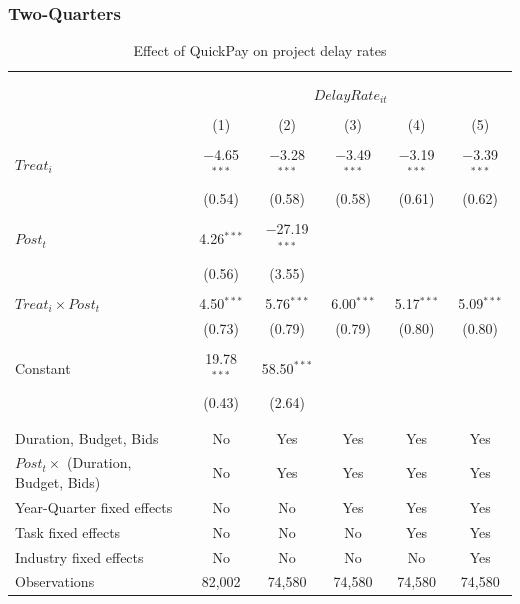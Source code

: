 \documentclass[
]{article}
\begin{document}
\hypertarget{two-quarters}{%
\subsubsection{Two-Quarters}\label{two-quarters}}

\begin{table}[H] \centering 
  \caption{Effect of QuickPay on project delay rates} 
  \label{} 
\small 
\begin{tabular}{@{\extracolsep{-2pt}}lccccc} 
\\[-1.8ex]\hline 
\hline \\[-1.8ex] 
\\[-1.8ex] & \multicolumn{5}{c}{$DelayRate_{it}$} \\ 
\\[-1.8ex] & (1) & (2) & (3) & (4) & (5)\\ 
\hline \\[-1.8ex] 
 $Treat_i$ & $-$4.65$^{***}$ & $-$3.28$^{***}$ & $-$3.49$^{***}$ & $-$3.19$^{***}$ & $-$3.39$^{***}$ \\ 
  & (0.54) & (0.58) & (0.58) & (0.61) & (0.62) \\ 
  & & & & & \\ 
 $Post_t$ & 4.26$^{***}$ & $-$27.19$^{***}$ &  &  &  \\ 
  & (0.56) & (3.55) &  &  &  \\ 
  & & & & & \\ 
 $Treat_i \times Post_t$ & 4.50$^{***}$ & 5.76$^{***}$ & 6.00$^{***}$ & 5.17$^{***}$ & 5.09$^{***}$ \\ 
  & (0.73) & (0.79) & (0.79) & (0.80) & (0.80) \\ 
  & & & & & \\ 
 Constant & 19.78$^{***}$ & 58.50$^{***}$ &  &  &  \\ 
  & (0.43) & (2.64) &  &  &  \\ 
  & & & & & \\ 
\hline \\[-1.8ex] 
Duration, Budget, Bids & No & Yes & Yes & Yes & Yes \\ 
$Post_t \times$  (Duration, Budget, Bids) & No & Yes & Yes & Yes & Yes \\ 
Year-Quarter fixed effects & No & No & Yes & Yes & Yes \\ 
Task fixed effects & No & No & No & Yes & Yes \\ 
Industry fixed effects & No & No & No & No & Yes \\ 
Observations & 82,002 & 74,580 & 74,580 & 74,580 & 74,580 \\ 

\end{tabular}
\end{table}
\end{document}
